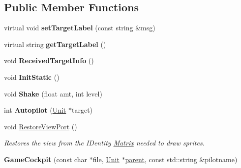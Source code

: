\subsection*{Public Member Functions}
\begin{DoxyCompactItemize}
\item 
virtual void {\bfseries set\+Target\+Label} (const string \&msg)\hypertarget{classGameCockpit_aae5fc2e6199274862b1742a1520f0f3a}{}\label{classGameCockpit_aae5fc2e6199274862b1742a1520f0f3a}

\item 
virtual string {\bfseries get\+Target\+Label} ()\hypertarget{classGameCockpit_a94c8f776b17a3a2c4a30c5a2f000e56d}{}\label{classGameCockpit_a94c8f776b17a3a2c4a30c5a2f000e56d}

\item 
void {\bfseries Received\+Target\+Info} ()\hypertarget{classGameCockpit_a72ea240a0bbcac38dd9e45d8fabdcc9d}{}\label{classGameCockpit_a72ea240a0bbcac38dd9e45d8fabdcc9d}

\item 
void {\bfseries Init\+Static} ()\hypertarget{classGameCockpit_aab82f16dc5dfeb8ef8f692860df041b9}{}\label{classGameCockpit_aab82f16dc5dfeb8ef8f692860df041b9}

\item 
void {\bfseries Shake} (float amt, int level)\hypertarget{classGameCockpit_a4270bc790c68071204788278261637d2}{}\label{classGameCockpit_a4270bc790c68071204788278261637d2}

\item 
int {\bfseries Autopilot} (\hyperlink{classUnit}{Unit} $\ast$target)\hypertarget{classGameCockpit_a500b6cff2de8d35e0e81337b349088cb}{}\label{classGameCockpit_a500b6cff2de8d35e0e81337b349088cb}

\item 
void \hyperlink{classGameCockpit_af149854832503d1196ed1ddd4393c6f8}{Restore\+View\+Port} ()\hypertarget{classGameCockpit_af149854832503d1196ed1ddd4393c6f8}{}\label{classGameCockpit_af149854832503d1196ed1ddd4393c6f8}

\begin{DoxyCompactList}\small\item\em Restores the view from the I\+Dentity \hyperlink{classMatrix}{Matrix} needed to draw sprites. \end{DoxyCompactList}\item 
{\bfseries Game\+Cockpit} (const char $\ast$file, \hyperlink{classUnit}{Unit} $\ast$\hyperlink{classCockpit_a5a28bce27feff8d43de419368eb2da1c}{parent}, const std\+::string \&pilotname)\hypertarget{classGameCockpit_aad80c2889052496e01da34c7ad6d884e}{}\label{classGameCockpit_aad80c2889052496e01da34c7ad6d884e}


\end{DoxyCompactItemize}
